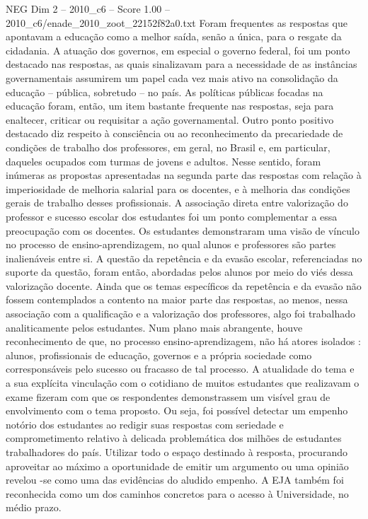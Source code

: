 \begin{textsample}{NEG Dim 2 – 2010\_c6 – Score 1.00 – 2010\_c6/enade\_2010\_zoot\_22152f82a0.txt}
Foram frequentes as respostas que apontavam a educação como a melhor saída, senão a única, para o resgate da cidadania.
A atuação dos governos, em especial o governo federal, foi um ponto destacado nas respostas, as quais sinalizavam para a necessidade de as instâncias governamentais assumirem um papel cada vez mais ativo na consolidação da educação – pública, sobretudo – no país.
As políticas públicas focadas na educação foram, então, um item bastante frequente nas respostas, seja para enaltecer, criticar ou requisitar a ação governamental.
Outro ponto positivo destacado diz respeito à consciência ou ao reconhecimento da precariedade de condições de trabalho dos professores, em geral, no Brasil e, em particular, daqueles ocupados com turmas de jovens e adultos.
Nesse sentido, foram inúmeras as propostas apresentadas na segunda parte das respostas com relação à imperiosidade de melhoria salarial para os docentes, e à melhoria das condições gerais de trabalho desses profissionais.
A associação direta entre valorização do professor e sucesso escolar dos estudantes foi um ponto complementar a essa preocupação com os docentes.
Os estudantes demonstraram uma visão de vínculo no processo de ensino-aprendizagem, no qual alunos e professores são partes inalienáveis entre si.
A questão da repetência e da evasão escolar, referenciadas no suporte da questão, foram então, abordadas pelos alunos por meio do viés dessa valorização docente.
Ainda que os temas específicos da repetência e da evasão não fossem contemplados a contento na maior parte das respostas, ao menos, nessa associação com a qualificação e a valorização dos professores, algo foi trabalhado analiticamente pelos estudantes.
Num plano mais abrangente, houve reconhecimento de que, no processo ensino-aprendizagem, não há atores isolados : alunos, profissionais de educação, governos e a própria sociedade como corresponsáveis pelo sucesso ou fracasso de tal processo.
A atualidade do tema e a sua explícita vinculação com o cotidiano de muitos estudantes que realizavam o exame fizeram com que os respondentes demonstrassem um visível grau de envolvimento com o tema proposto.
Ou seja, foi possível detectar um empenho notório dos estudantes ao redigir suas respostas com seriedade e comprometimento relativo à delicada problemática dos milhões de estudantes trabalhadores do país.
Utilizar todo o espaço destinado à resposta, procurando aproveitar ao máximo a oportunidade de emitir um argumento ou uma opinião revelou -se como uma das evidências do aludido empenho.
A EJA também foi reconhecida como um dos caminhos concretos para o acesso à Universidade, no médio prazo.

\end{textsample}
